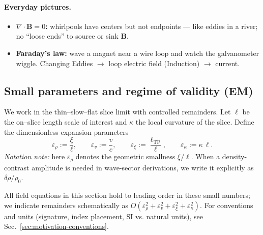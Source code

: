 \paragraph{Everyday pictures.}
\begin{itemize}
  \item \textbf{$\nabla\!\cdot\!\mathbf B=0$:} whirlpools have centers but not endpoints --- like eddies in a river; no ``loose ends'' to source or sink $\mathbf B$.
  \item \textbf{Faraday's law:} wave a magnet near a wire loop and watch the galvanometer wiggle. Changing Eddies $\to$ loop electric field (Induction) $\to$ current.
\end{itemize}

\subsection{Small parameters and regime of validity (EM)}
\label{sec:EM_validity}
We work in the thin–slow–flat slice limit with controlled remainders. Let $\ell$ be the on–slice length scale of interest and $\kappa$ the local curvature of the slice. Define the dimensionless expansion parameters
\[
\varepsilon_\rho := \frac{\xi}{\ell},\qquad
\varepsilon_v := \frac{v}{c},\qquad
\varepsilon_\xi := \frac{\ell_{\mathrm{TP}}}{\ell},\qquad
\varepsilon_\kappa := \kappa\,\ell.
\]
\emph{Notation note:} here $\varepsilon_\rho$ denotes the geometric smallness $\xi/\ell$. When a density-contrast amplitude is needed in wave-sector derivations, we write it explicitly as $\delta\rho/\rho_0$.

All field equations in this section hold to leading order in these small numbers; we indicate remainders schematically as $O(\varepsilon_\rho^2+\varepsilon_v^2+\varepsilon_\xi^2+\varepsilon_\kappa^2)$. For conventions and units (signature, index placement, SI vs. natural units), see Sec.~\ref{sec:motivation-conventions}.

